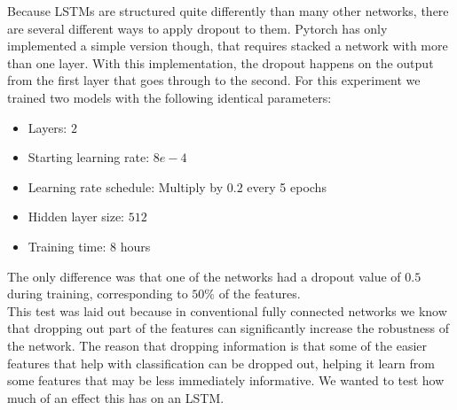 Because LSTMs are structured quite differently than many other networks, there are several different ways to apply dropout to them.\cite{dropout} Pytorch has only implemented a simple version though, that requires stacked a network with more than one layer. With this implementation, the dropout happens on the output from the first layer that goes through to the second. For this experiment we trained two models with the following identical parameters:
\begin{itemize}
	\item Layers: $2$
	\item Starting learning rate: $8e-4$
	\item Learning rate schedule: Multiply by $0.2$ every 5 epochs
	\item Hidden layer size: $512$
	\item Training time: 8 hours
\end{itemize}
The only difference was that one of the networks had a dropout value of $0.5$ during training, corresponding to $50\%$ of the features.\\

\noindent
This test was laid out because in conventional fully connected networks we know that dropping out part of the features can significantly increase the robustness of the network. The reason that dropping information is that some of the easier features that help with classification can be dropped out, helping it learn from some features that may be less immediately informative. We wanted to test how much of an effect this has on an LSTM.

%
